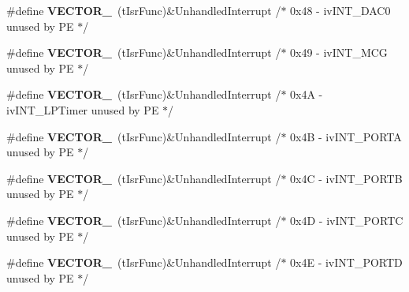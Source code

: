 \begin{DoxyCompactItemize}
\item 
\#define {\bfseries V\+E\+C\+T\+O\+R\+\_}~(t\+Isr\+Func)\&Unhandled\+Interrupt         /$\ast$ 0x48 -\/    iv\+I\+N\+T\+\_\+\+D\+A\+C0                     unused by P\+E $\ast$/\hypertarget{group___vectors___config__module_ga106ee13e56f09797738cdd6236e8804f}{}\label{group___vectors___config__module_ga106ee13e56f09797738cdd6236e8804f}

\item 
\#define {\bfseries V\+E\+C\+T\+O\+R\+\_}~(t\+Isr\+Func)\&Unhandled\+Interrupt         /$\ast$ 0x49 -\/    iv\+I\+N\+T\+\_\+\+M\+C\+G                      unused by P\+E $\ast$/\hypertarget{group___vectors___config__module_gaaef16635a52ec12ea01919a74eb3c341}{}\label{group___vectors___config__module_gaaef16635a52ec12ea01919a74eb3c341}

\item 
\#define {\bfseries V\+E\+C\+T\+O\+R\+\_}~(t\+Isr\+Func)\&Unhandled\+Interrupt         /$\ast$ 0x4\+A -\/    iv\+I\+N\+T\+\_\+\+L\+P\+Timer                  unused by P\+E $\ast$/\hypertarget{group___vectors___config__module_ga2b8545255c6c33be2e2fcefc0cb2d043}{}\label{group___vectors___config__module_ga2b8545255c6c33be2e2fcefc0cb2d043}

\item 
\#define {\bfseries V\+E\+C\+T\+O\+R\+\_}~(t\+Isr\+Func)\&Unhandled\+Interrupt         /$\ast$ 0x4\+B -\/    iv\+I\+N\+T\+\_\+\+P\+O\+R\+T\+A                    unused by P\+E $\ast$/\hypertarget{group___vectors___config__module_ga16f0ff98786bd2e1d4a7b7dd2f0059ab}{}\label{group___vectors___config__module_ga16f0ff98786bd2e1d4a7b7dd2f0059ab}

\item 
\#define {\bfseries V\+E\+C\+T\+O\+R\+\_}~(t\+Isr\+Func)\&Unhandled\+Interrupt         /$\ast$ 0x4\+C -\/    iv\+I\+N\+T\+\_\+\+P\+O\+R\+T\+B                    unused by P\+E $\ast$/\hypertarget{group___vectors___config__module_gad185a6cdfcb9a82bd56ce83084a29935}{}\label{group___vectors___config__module_gad185a6cdfcb9a82bd56ce83084a29935}

\item 
\#define {\bfseries V\+E\+C\+T\+O\+R\+\_}~(t\+Isr\+Func)\&Unhandled\+Interrupt         /$\ast$ 0x4\+D -\/    iv\+I\+N\+T\+\_\+\+P\+O\+R\+T\+C                    unused by P\+E $\ast$/\hypertarget{group___vectors___config__module_gafe5a83192da5a3b18caac8e0a6ea61f5}{}\label{group___vectors___config__module_gafe5a83192da5a3b18caac8e0a6ea61f5}

\item 
\#define {\bfseries V\+E\+C\+T\+O\+R\+\_}~(t\+Isr\+Func)\&Unhandled\+Interrupt         /$\ast$ 0x4\+E -\/    iv\+I\+N\+T\+\_\+\+P\+O\+R\+T\+D                    unused by P\+E $\ast$/\hypertarget{group___vectors___config__module_ga94a7723d66a84b0bcf6b0439dbcb041a}{}\label{group___vectors___config__module_ga94a7723d66a84b0bcf6b0439dbcb041a}


\end{DoxyCompactItemize}
